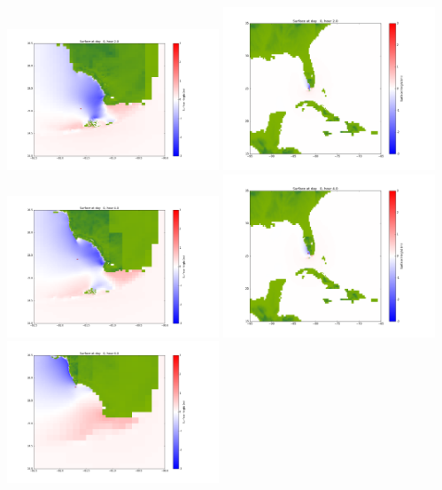 \documentclass[11pt]{article}
\begin{document}
\vskip 10pt 
\includegraphics[width=0.475\textwidth]{frame0025fig1001.png}
\includegraphics[width=0.475\textwidth]{frame0025fig1002.png}
\vskip 10pt 
\includegraphics[width=0.475\textwidth]{frame0026fig1001.png}
\includegraphics[width=0.475\textwidth]{frame0026fig1002.png}
\vskip 10pt 
\includegraphics[width=0.475\textwidth]{frame0027fig1001.png}
\end{document}
